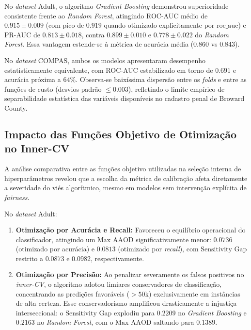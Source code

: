 No \textit{dataset} Adult, o algoritmo \textit{Gradient Boosting} demonstrou superioridade consistente frente ao \textit{Random Forest}, atingindo ROC-AUC médio de $0.915 \pm 0.009$ (com pico de $0.919$ quando otimizado explicitamente por $\text{roc\_auc}$) e PR-AUC de $0.813 \pm 0.018$, contra $0.899 \pm 0.010$ e $0.778 \pm 0.022$ do \textit{Random Forest}. Essa vantagem estende-se à métrica de acurácia média ($0.860$ vs $0.843$).

No \textit{dataset} COMPAS, ambos os modelos apresentaram desempenho estatisticamente equivalente, com ROC-AUC estabilizado em torno de $0.691$ e acurácia próxima a $64\%$. Observa-se baixíssima dispersão entre os \textit{folds} e entre as funções de custo (desvios-padrão $\le 0.003$), refletindo o limite empírico de separabilidade estatística das variáveis disponíveis no cadastro penal de Broward County.

\subsection{Impacto das Funções Objetivo de Otimização no Inner-CV}
\label{subsec:impacto_funcoes_objetivo}

A análise comparativa entre as funções objetivo utilizadas na seleção interna de hiperparâmetros revelou que a escolha da métrica de calibração afeta diretamente a severidade do viés algorítmico, mesmo em modelos sem intervenção explícita de \textit{fairness}.

No \textit{dataset} Adult:
\begin{enumerate}
    \item \textbf{Otimização por Acurácia e Recall:} Favoreceu o equilíbrio operacional do classificador, atingindo um $\text{Max AAOD}$ significativamente menor: $0.0736$ (otimizado por acurácia) e $0.0813$ (otimizado por \textit{recall}), com $\text{Sensitivity Gap}$ restrito a $0.0873$ e $0.0982$, respectivamente.
    \item \textbf{Otimização por Precisão:} Ao penalizar severamente os falsos positivos no \textit{inner-CV}, o algoritmo adotou limiares conservadores de classificação, concentrando as predições favoráveis ($>50\text{k}$) exclusivamente em instâncias de alta certeza. Esse conservadorismo amplificou drasticamente a injustiça interseccional: o $\text{Sensitivity Gap}$ explodiu para $0.2209$ no \textit{Gradient Boosting} e $0.2163$ no \textit{Random Forest}, com o $\text{Max AAOD}$ saltando para $0.1389$.
\end{enumerate}

